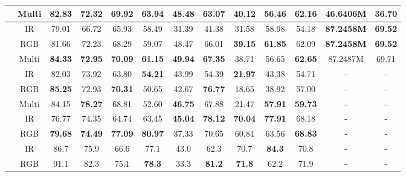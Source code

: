 \begin{table*}[htpb]
{\begin{tabular}{c|c|c|c|c|c|c|c|c|c|c|c|c}
		& Multi & \textbf{82.83} & \textbf{72.32} & \textbf{69.92} & \textbf{63.94} & \textbf{48.48} & 63.07          & \textbf{40.12} & 56.46          & \textbf{62.16} &46.6406M &36.70 \\
		\midrule
		\textbf{\multirow{3}{*}{YOLOv5x \cite{yolov5}} }& IR         & 79.01          & 66.72          & 65.93          & 58.49          & 31.39          & 41.38          & 31.58          & 58.98          & 54.18     &\textbf{87.2458M} &\textbf{69.52}     \\
		& RGB        & 81.66          & 72.23          & 68.29          & 59.07          & 48.47          & 66.01          & \textbf{39.15} & \textbf{61.85} & 62.09        &\textbf{87.2458M} &\textbf{69.52}   \\
		& Multi & \textbf{84.33} & \textbf{72.95} & \textbf{70.09} & \textbf{61.15} & \textbf{49.94} & \textbf{67.35} & 38.71          & 56.65          & \textbf{62.65} & 87.2487M &69.71\\
		\midrule
		\textbf{\multirow{3}{*}{YOLOrs \cite{9273212}} }& IR         & 82.03          & 73.92         & 63.80          & \textbf{54.21 }        & 43.99          & 54.39          & \textbf{21.97 }         & 43.38          & 54.71     &- &-     \\
		& RGB        & \textbf{85.25}          & 72.93          & \textbf{70.31}          & 50.65         & 42.67          & \textbf{76.77}          & 18.65 & 38.92 & 57.00        &- &-  \\
		& Multi & 84.15 & \textbf{78.27} & 68.81 & 52.60 & \textbf{46.75} & 67.88 & 21.47         & \textbf{57.91}         & \textbf{59.73} & - &-\\
		\midrule
		\textbf{\multirow{2}{*}{YOLO-Fine \cite{pham2020yolo}} }& IR       & 76.77          & 74.35         & 64.74         & 63.45          & \textbf{45.04}          & \textbf{78.12}          & \textbf{70.04} & \textbf{77.91} & 68.18        &- &-   \\
		& RGB         & \textbf{79.68}         & \textbf{74.49}        & \textbf{77.09}          & \textbf{80.97}          & 37.33          & 70.65          & 60.84          & 63.56         & \textbf{68.83}     &- &-     \\
		\midrule
		\textbf{\multirow{3}{*}{YOLOFusion* \cite{qingyun2022cross}} } & IR        & 86.7          & 75.9          &66.6         & 77.1         & 43.0          & 62.3          & 70.7 & \textbf{84.3} & 70.8       &- &-  \\
		& RGB       & 91.1          & 82.3         & 75.1          & \textbf{78.3}        & 33.3          & \textbf{81.2}          & \textbf{71.8}         & 62.2          &  71.9    &- &-     \\

\end{tabular}}
\end{table*}
